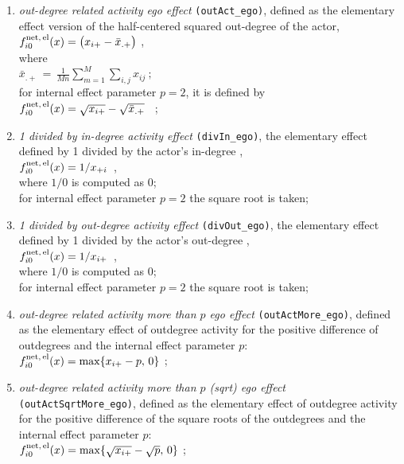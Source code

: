 \documentclass[a4paper,fleqn,11pt]{article}
\newcommand{\+}{\, + \,}
\newcommand{\vit}{\theenumi}
\begin{document}
\begin{enumerate}
 \item {\em out-degree related activity ego effect} \texttt{(outAct\_ego)},
 	 defined as the elementary effect version of the half-centered
 squared out-degree of the actor,\\
 $ f^{\rm net,\, el}_{i\vit}(x)  =  \big(  x_{i+} - \bar x_{.+}\big)$ ,\\
 where\\
 $ \bar x_{.+} \,=\,  \frac{1}{Mn} \sum_{m=1}^M \sum_{i,j} x_{ij} \ ;  $ \\
 for internal effect parameter $p=2$, it is defined by\\
 $f^{\rm net,\, el}_{i\vit}(x)  =   \sqrt{  x_{i+}} -  \sqrt{\bar x_{.+}} $ \ ; \\

 \item {\em 1 divided by in-degree activity effect} \texttt{(divIn\_ego)},
 the elementary effect defined by 1 divided by the actor's in-degree ,\\
 $ f^{\rm net,\, el}_{i\vit}(x)  =  1/ x_{+i}\,$ ,\\
 where $1/0$ is computed as 0;\\
  for internal effect parameter $p=2$ the square root is taken;

 \item {\em 1 divided by out-degree activity effect} \texttt{(divOut\_ego)},
 the elementary effect defined by 1 divided by the actor's out-degree ,\\
 $ f^{\rm net,\, el}_{i\vit}(x)  =  1/ x_{i+}\,$ ,\\
 where $1/0$ is computed as 0;\\
 for internal effect parameter $p=2$ the square root is taken;

 \item {\em out-degree related activity more than $p$ ego effect} \texttt{(outActMore\_ego)},
 	 defined as the elementary effect of outdegree activity
 for the positive difference of outdegrees and the internal effect parameter $p$:\\
 $ f^{\rm net,\, el}_{i\vit}(x)  =  \max \{  x_{i+} - p, \, 0 \} $ ;\\

 \item {\em out-degree related activity more than $p$ (sqrt) ego effect} \texttt{(outActSqrtMore\_ego)},
 	 defined as the elementary effect of outdegree activity
 for the positive difference of the square roots of the outdegrees and the internal effect parameter $p$:\\
 $ f^{\rm net,\, el}_{i\vit}(x)  =  \max \{  \sqrt{x_{i+}} -\sqrt{p} ,\, 0 \} $ ;\\


\end{enumerate}
\end{document}
